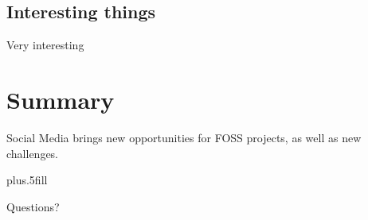 \documentclass{beamer}
\begin{document}
\subsection{Interesting things}

\begin{frame}
Very interesting
\end{frame}

\section*{Summary}

\begin{frame}
Social Media brings new opportunities for FOSS projects, as well as
new challenges.

  
  \pause
  \vskip0pt plus.5fill

  Questions?
\end{frame}
\end{document}
